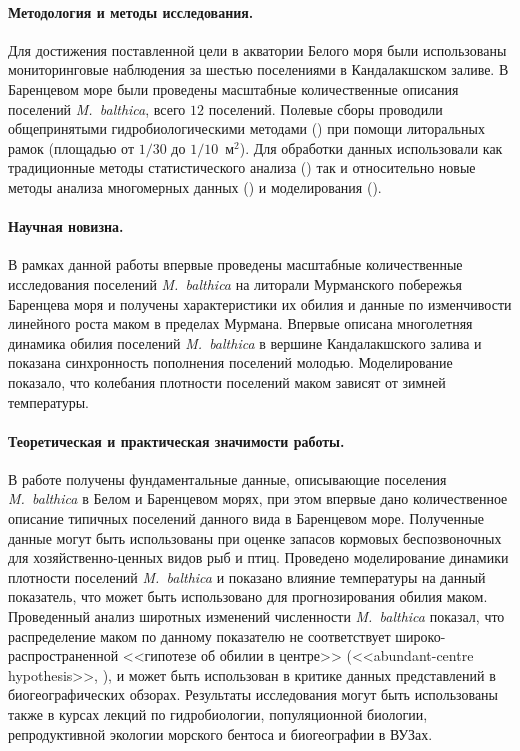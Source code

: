 \paragraph{Методология и методы исследования.}
Для достижения поставленной цели в акватории Белого моря были использованы мониторинговые наблюдения за шестью поселениями в Кандалакшском заливе.
В Баренцевом море были проведены масштабные количественные описания поселений {\it M.~balthica}, всего $12$ поселений.
Полевые сборы проводили общепринятыми гидробиологическими методами (\cite{Eleftheriou_2013}) при помощи литоральных рамок (площадью от $1/30$ до $1/10$~м$^2$).
Для обработки данных использовали как традиционные методы статистического анализа (\cite{Tukey_1977, Mardia_et_al_1979, Chambers_Hastie_1991, Legendre_Legendre_2012, Hollander_et_al_2013}) так и относительно новые методы анализа многомерных данных (\cite{Clarke_et_al_2008}) и моделирования (\cite{Berryman_Turchin_2001}).
%
\paragraph{Научная новизна.}
В рамках данной работы впервые проведены масштабные количественные исследования поселений \textit{M.~balthica} на литорали Мурманского побережья Баренцева моря и получены характеристики их обилия и данные по изменчивости линейного роста маком в пределах Мурмана.
Впервые описана многолетняя динамика обилия поселений \textit{M.~balthica} в вершине Кандалакшского залива и показана синхронность пополнения поселений молодью.
Моделирование показало, что колебания плотности поселений маком зависят от зимней температуры.
%
\paragraph{Теоретическая и практическая значимости работы.}
В работе получены фундаментальные данные, описывающие поселения \textit{M.~balthica} в Белом и Баренцевом морях, при этом впервые дано количественное описание типичных поселений данного вида в Баренцевом море. 
Полученные данные могут быть использованы при оценке запасов кормовых беспозвоночных для хозяйственно-ценных видов рыб и птиц.
Проведено моделирование динамики плотности поселений \textit{M.~balthica} и показано влияние температуры на данный показатель, что может быть использовано для прогнозирования обилия маком. 
Проведенный анализ широтных изменений численности \textit{M.~balthica} показал, что распределение маком по данному показателю не соответствует широко-распространенной  <<гипотезе об обилии в центре>> (<<abundant-centre hypothesis>>, \cite{Sagarin_et_al_2006}), и может быть использован в критике данных представлений в биогеографических обзорах.
Результаты исследования могут быть использованы также в курсах лекций по гидробиологии, популяционной биологии, репродуктивной экологии морского бентоса и биогеографии в ВУЗах.
%
